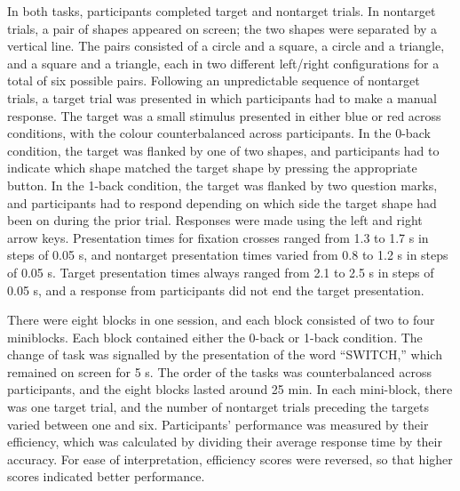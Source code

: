 In both tasks, participants completed target and nontarget trials. In nontarget trials, a pair of shapes appeared on screen; the two shapes were separated by a vertical line. The pairs consisted of a circle and a square, a circle and a triangle, and a square and a triangle, each in two different left/right configurations for a total of six possible pairs. Following an unpredictable sequence of nontarget trials, a target trial was presented in which participants had to make a manual response. The target was a small stimulus presented in either blue or red across conditions, with the colour counterbalanced across participants. In the 0-back condition, the target was flanked by one of two shapes, and participants had to indicate which shape matched the target shape by pressing the appropriate button. In the 1-back condition, the target was flanked by two question marks, and participants had to respond depending on which side the target shape had been on during the prior trial. Responses were made using the left and right arrow keys. Presentation times for fixation crosses ranged from 1.3 to 1.7 s in steps of 0.05 s, and nontarget presentation times varied from 0.8 to 1.2 s in steps of 0.05 s. Target presentation times always ranged from 2.1 to 2.5 s in steps of 0.05 s, and a response from participants did not end the target presentation.

There were eight blocks in one session, and each block consisted of two to four miniblocks. Each block contained either the 0-back or 1-back condition. The change of task was signalled by the presentation of the word “SWITCH,” which remained on screen for 5 s. The order of the tasks was counterbalanced across participants, and the eight blocks lasted around 25 min. In each mini-block, there was one target trial, and the number of nontarget trials preceding the targets varied between one and six. Participants’ performance was measured by their efficiency, which was calculated by dividing their average response time by their accuracy. For ease of interpretation, efficiency scores were reversed, so that higher scores indicated better performance.

